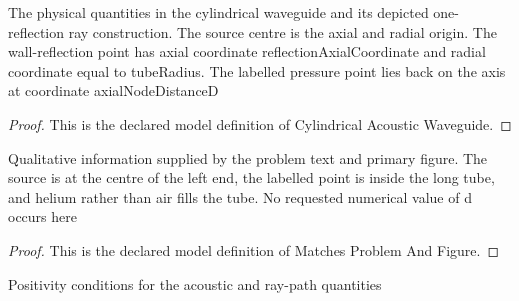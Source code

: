 \begin{definition}
  \label{def:physics:phyx-mini-0118:phyxminiproblems-problemphyxmini0118-cylindricalacousticwaveguide}
  The physical quantities in the cylindrical waveguide and its depicted one-reflection ray construction. The source centre is the axial and radial origin. The wall-reflection point has axial coordinate reflectionAxialCoordinate and radial coordinate equal to tubeRadius. The labelled pressure point lies back on the axis at coordinate axialNodeDistanceD
\end{definition}
\begin{proof}
  This is the declared model definition of Cylindrical Acoustic Waveguide.
\end{proof}
\begin{definition}
  \label{def:physics:phyx-mini-0118:phyxminiproblems-problemphyxmini0118-matchesproblemandfigure}
  Qualitative information supplied by the problem text and primary figure. The source is at the centre of the left end, the labelled point is inside the long tube, and helium rather than air fills the tube. No requested numerical value of d occurs here
\end{definition}
\begin{proof}
  This is the declared model definition of Matches Problem And Figure.
\end{proof}
\begin{definition}
  \label{def:physics:phyx-mini-0118:phyxminiproblems-problemphyxmini0118-hasphysicalparameters}
  Positivity conditions for the acoustic and ray-path quantities
\end{definition}
